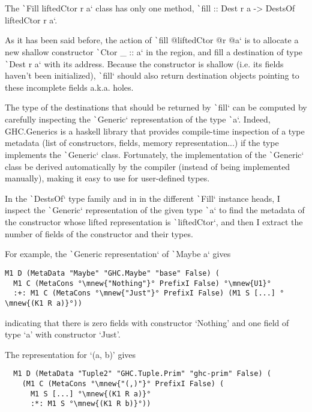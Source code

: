 \documentclass[english]{jflart}
\begin{document}
The \texttt`Fill liftedCtor r a` class has only one method, \texttt`fill :: Dest r a -> DestsOf liftedCtor r a`.

As it has been said before, the action of \texttt`fill @liftedCtor @r @a` is to allocate a new shallow constructor \texttt`Ctor _ :: a` in the region, and fill a destination of type \texttt`Dest r a` with its address. Because the constructor is shallow (i.e. its fields haven't been initialized), \texttt`fill` should also return destination objects pointing to these incomplete fields a.k.a. holes.

The type of the destinations that should be returned by \texttt`fill` can be computed by carefully inspecting the \texttt`Generic` representation of the type \texttt`a`. Indeed, GHC.Generics is a haskell library that provides compile-time inspection of a type metadata (list of constructors, fields, memory representation...) if the type implements the \texttt`Generic` class. Fortunately, the implementation of the \texttt`Generic` class be derived automatically by the compiler (instead of being implemented manually), making it easy to use for user-defined types.

In the \texttt`DestsOf` type family and in in the different \texttt`Fill` instance heads, I inspect the \texttt`Generic` representation of the given type \texttt`a` to find the metadata of the constructor whose lifted representation is \texttt`liftedCtor`, and then I extract the number of fields of the constructor and their types.

For example, the \texttt`Generic representation` of \texttt`Maybe a` gives

\begin{verbatim}
M1 D (MetaData "Maybe" "GHC.Maybe" "base" False) (
  M1 C (MetaCons °\mnew{"Nothing"}° PrefixI False) °\mnew{U1}°
  :+: M1 C (MetaCons °\mnew{"Just"}° PrefixI False) (M1 S [...] °\mnew{(K1 R a)}°))
\end{verbatim}

indicating that there is zero fields with constructor `Nothing' and one field of type `a' with constructor `Just'. 


The representation for `(a, b)' gives

\begin{verbatim}
  M1 D (MetaData "Tuple2" "GHC.Tuple.Prim" "ghc-prim" False) (
    (M1 C (MetaCons °\mnew{"(,)"}° PrefixI False) (
      M1 S [...] °\mnew{(K1 R a)}°
      :*: M1 S °\mnew{(K1 R b)}°))
  \end{verbatim}
\end{document}
